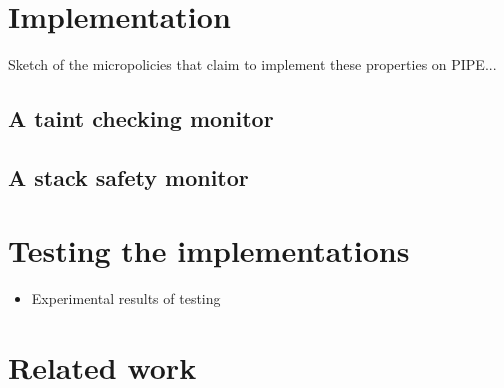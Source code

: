 \documentclass[conference]{IEEEtran}
\newif\iftext \textfalse
\begin{document}
\iftext
\section{Stack + heap protection too}

POTENTIALLY: Memory safety (before stack) + Conjunction of memory + stack
safety (after).

(Memory safety by itself is just arthur’s paper, but it’s cool to see how
they are combined, especially what bits can be factored out as common
structure, e.g. the notion of accessibility)
\fi

\section{Implementation}
\label{impl}

Sketch of the micropolicies that claim to implement these properties on
PIPE...

\subsection{A taint checking monitor}

\subsection{A stack safety monitor}

\section{Testing the implementations}

\begin{itemize}
\item Experimental results of testing
\end{itemize}

\section{Related work}
\end{document}
